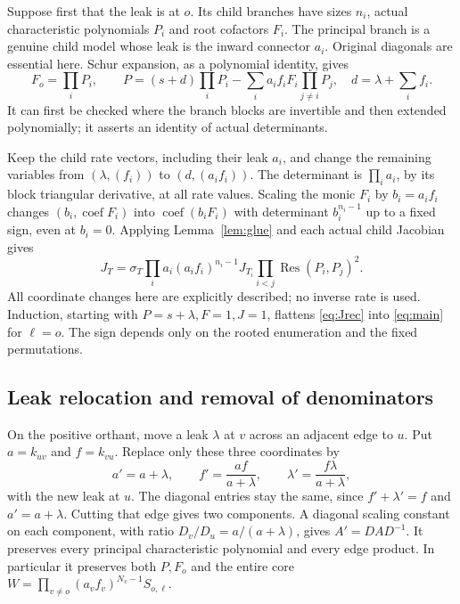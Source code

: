 \documentclass[11pt]{article}
\theoremstyle{remark}
\newcommand{\Res}{\operatorname{Res}}
\newcommand{\1}{\mathbf 1}
\newcommand{\coef}{\operatorname{coef}}
\begin{document}
Suppose first that the leak is at $o$. Its child branches have sizes $n_i$,
actual characteristic polynomials $P_i$ and root cofactors $F_i$.
The principal branch is a genuine child model whose leak is the inward
connector $a_i$. Original diagonals are essential here. Schur expansion,
as a polynomial identity, gives
\begin{equation}\label{eq:recursion}
 F_o=\prod_i P_i,\qquad
 P=(s+d)\prod_i P_i-\sum_i a_if_iF_i\prod_{j\ne i}P_j,
 \quad d=\lambda+\sum_i f_i.
\end{equation}
It can first be checked where the branch blocks are invertible and then
extended polynomially; it asserts an identity of actual determinants.

Keep the child rate vectors, including their leak $a_i$, and change the
remaining variables from $(\lambda,(f_i))$ to $(d,(a_if_i))$.
The determinant is $\prod_i a_i$, by its block triangular derivative,
at all rate values. Scaling the monic $F_i$ by $b_i=a_if_i$ changes
$(b_i,\coef F_i)$ into $\coef(b_iF_i)$ with determinant
$b_i^{n_i-1}$ up to a fixed sign, even at $b_i=0$.
Applying Lemma~\ref{lem:glue} and each actual child Jacobian gives
\begin{equation}\label{eq:Jrec}
 J_T=\sigma_T\prod_i a_i(a_if_i)^{n_i-1}J_{T_i}
             \prod_{i<j}\Res(P_i,P_j)^2.
\end{equation}
All coordinate changes here are explicitly described; no inverse rate is used.
Induction, starting with $P=s+\lambda,F=1,J=1$, flattens
\eqref{eq:Jrec} into \eqref{eq:main} for $\ell=o$.
The sign depends only on the rooted enumeration and the fixed permutations.

\subsection{Leak relocation and removal of denominators}
On the positive orthant, move a leak $\lambda$ at $v$ across an adjacent edge
to $u$. Put $a=k_{u v}$ and $f=k_{v u}$. Replace only these three coordinates by
\begin{equation}\label{eq:slide}
 a'=a+\lambda,\qquad f'=\frac{af}{a+\lambda},\qquad
 \lambda'=\frac{f\lambda}{a+\lambda},
\end{equation}
with the new leak at $u$. The diagonal entries stay the same, since
$f'+\lambda'=f$ and $a'=a+\lambda$.
Cutting that edge gives two components. A diagonal scaling constant on each
component, with ratio $D_v/D_u=a/(a+\lambda)$, gives $A'=DAD^{-1}$.
It preserves every principal characteristic polynomial and every edge product.
In particular it preserves both $P,F_o$ and the entire core
$W=\prod_{v\ne o}(a_vf_v)^{N_v-1}S_{o,\ell}$.
\end{document}
